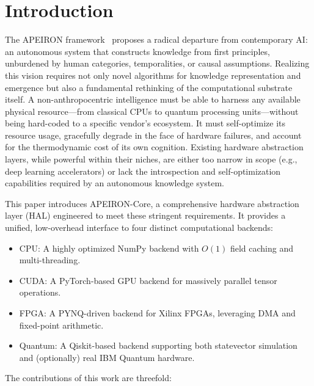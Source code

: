 \newpage
\section{Introduction}

The APEIRON framework~\cite{beniers2026apeiron} proposes a radical departure from contemporary AI: an autonomous system that constructs knowledge from first principles, unburdened by human categories, temporalities, or causal assumptions. Realizing this vision requires not only novel algorithms for knowledge representation and emergence but also a fundamental rethinking of the computational substrate itself. A non-anthropocentric intelligence must be able to harness any available physical resource—from classical CPUs to quantum processing units—without being hard-coded to a specific vendor's ecosystem. It must self-optimize its resource usage, gracefully degrade in the face of hardware failures, and account for the thermodynamic cost of its own cognition. Existing hardware abstraction layers, while powerful within their niches, are either too narrow in scope (e.g., deep learning accelerators) or lack the introspection and self-optimization capabilities required by an autonomous knowledge system.

This paper introduces APEIRON-Core, a comprehensive hardware abstraction layer (HAL) engineered to meet these stringent requirements. It provides a unified, low-overhead interface to four distinct computational backends:

\begin{itemize}
    \item CPU: A highly optimized NumPy backend with \(O(1)\) field caching and multi-threading.
    \item CUDA: A PyTorch-based GPU backend for massively parallel tensor operations.
    \item FPGA: A PYNQ-driven backend for Xilinx FPGAs, leveraging DMA and fixed-point arithmetic.
    \item Quantum: A Qiskit-based backend supporting both statevector simulation and (optionally) real IBM Quantum hardware.
\end{itemize}

The contributions of this work are threefold:

